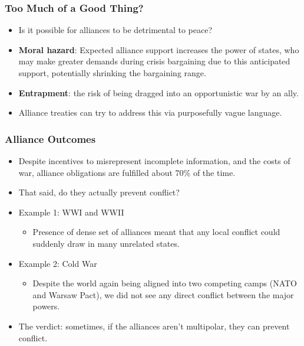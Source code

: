 \documentclass{beamer}
\begin{document}
\begin{frame} 
	\frametitle{\LARGE{Too Much of a Good Thing?}}
		\begin{itemize}
			\item Is it possible for alliances to be detrimental to peace? \pause
			\item \textbf{Moral hazard}: Expected alliance support increases the power of states, who may make greater demands during crisis bargaining due to this anticipated support, potentially shrinking the bargaining range. \pause
			\item \textbf{Entrapment}: the risk of being dragged into an opportunistic war by an ally. \pause  
			\item Alliance treaties can try to address this via purposefully vague language.
		\end{itemize}
\end{frame}

\begin{frame} 
	\frametitle{\LARGE{Alliance Outcomes}}
	\begin{itemize}
		\item Despite incentives to misrepresent incomplete information, and the costs of war, alliance obligations are fulfilled about 70\% of the time. \pause
		\item That said, do they actually prevent conflict? \pause
		\item Example 1:  WWI and WWII
		\begin{itemize}
			\item Presence of dense set of alliances meant that any local conflict could suddenly draw in many unrelated states.
		\end{itemize}
		\item Example 2:  Cold War
		\begin{itemize}
			\item Despite the world again being aligned into two competing camps (NATO and Warsaw Pact), we did not see any direct conflict between the major powers.
		\end{itemize}
		\item The verdict: sometimes, if the alliances aren't multipolar, they can prevent conflict.
	\end{itemize}
\end{frame}
\end{document}
